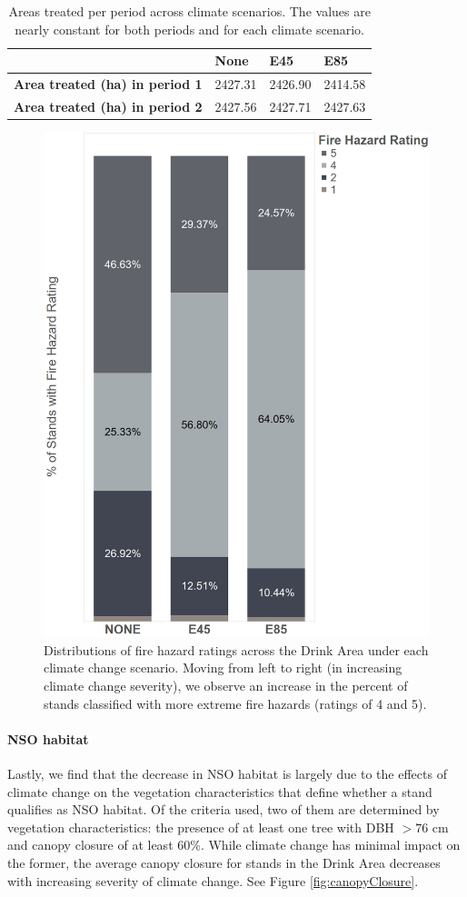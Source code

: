 \begin{table}[]
\centering
\caption[Area treated per period across climate scenarios]{Areas treated per period across climate scenarios. The values are nearly constant for both periods and for each climate scenario.}
\label{tab:treatedAreas}
\begin{tabular}{l|lll}
                                                                                                           & \textbf{None} & \textbf{E45} & \textbf{E85} \\ \hline
\textbf{Area treated (ha) in period 1} & 2427.31            & 2426.90 & 2414.58          \\
\textbf{Area treated (ha) in period 2}                     & 2427.56         & 2427.71        & 2427.63      
\end{tabular}
\end{table}

\begin{figure}[ht]
\centering
\includegraphics[width=.5\textwidth]{../images/FireHazardRatingsPerClimateScenario}
\caption[Distribution of fire hazard ratings over the Drink Area for each climate change scenario]{Distributions of fire hazard ratings across the Drink Area under each climate change scenario. Moving from left to right (in increasing climate change severity), we observe an increase in the percent of stands classified with more extreme fire hazards (ratings of 4 and 5).}
\label{fig:distOfFireHazards}
\end{figure}

\paragraph{NSO habitat}
Lastly, we find that the decrease in NSO habitat is largely due to the effects of climate change on the vegetation characteristics that define whether a stand qualifies as NSO habitat. Of the criteria used, two of them are determined by vegetation characteristics: the presence of at least one tree with DBH $> 76$ cm and canopy closure of at least 60\%. While climate change has minimal impact on the former, the average canopy closure for stands in the Drink Area decreases with increasing severity of climate change. See Figure \ref{fig:canopyClosure}.

